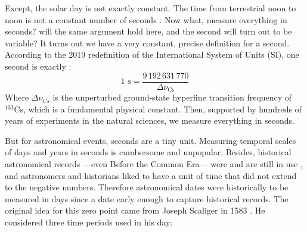 	Except, the solar day is not exactly constant. The time from terrestrial noon to noon is not a constant number of seconds \citep{McCarthy1986}.
	Now what, measure everything in seconds? will the same argument hold here, and the second will turn out to be variable? 
	It turns out we have a very constant, precise definition for a second. 
	According to the 2019 redefinition of the International System of Units (SI),
	one second is exactly \citep{si-brochure}:
	\begin{equation}
		1\text{ s} = \frac{9\,192\,631\,770}{\Delta\nu_{\text{Cs}}} \label{eq:SI-second}
	\end{equation}
	Where $\Delta\nu_{Cs}$ is the unperturbed ground-state hyperfine transition frequency of ${}^{133}\text{Cs}$, which is a fundamental physical constant.
	Then, supported by hundreds of years of experiments in the natural sciences, we measure everything in seconds. 
	
	
	But for astronomical events, seconds are a tiny unit. Measuring temporal scales of days and years in seconds is cumbersome and unpopular.
	Besides, historical astronomical records ---even Before the Common Era--- were and are still in use \citep{Morrison2004},
	and astronomers and historians liked to have a unit of time that did not extend to the negative numbers.
	Therefore astronomical dates were historically to be measured in days since a date early enough to capture historical records.
	The original idea for this zero point came from Joseph Scaliger in 1583 \citep{Carroll2017}. 
	He considered three time periods used in his day:
	
